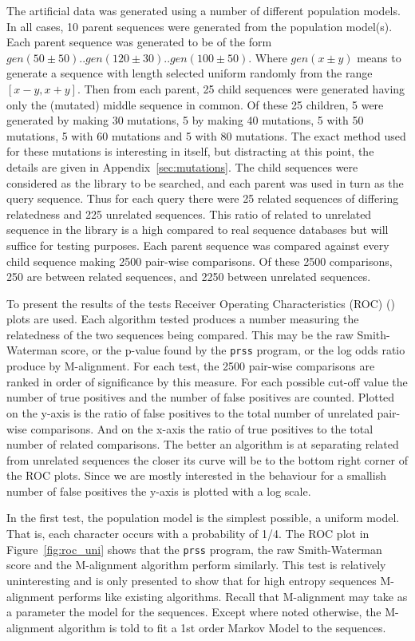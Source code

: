 \documentclass[letterpaper,11pt,oneside]{article}
\begin{document}
The artificial data was generated using a number of different population
models.  In all cases, 10 parent sequences were generated from the population
model(s).  Each parent sequence was generated to be of the form $gen(50\pm50)
.. gen(120\pm30) .. gen(100\pm50)$.  Where $gen(x\pm y)$ means to generate a
sequence with length selected uniform randomly from the range $[x-y, x+y]$.
Then from each parent, 25 child sequences were generated having only the
(mutated) middle sequence in common.  Of these 25 children, 5 were generated
by making 30 mutations, 5 by making 40 mutations, 5 with 50 mutations, 5 with
60 mutations and 5 with 80 mutations.  The exact method used for these
mutations is interesting in itself, but distracting at this point, the details
are given in Appendix~\ref{sec:mutations}.  The child sequences were
considered as the library to be searched, and each parent was used in turn as
the query sequence.  Thus for each query there were 25 related sequences of
differing relatedness and 225 unrelated sequences.  This ratio of related to
unrelated sequence in the library is a high compared to real sequence
databases but will suffice for testing purposes.  Each parent sequence was
compared against every child sequence making 2500 pair-wise comparisons.  Of
these 2500 comparisons, 250 are between related sequences, and 2250 between
unrelated sequences.

To present the results of the tests Receiver Operating Characteristics (ROC)
(\cite{gribskov96, brenner98}) plots are used.  Each algorithm tested produces
a number measuring the relatedness of the two sequences being compared.  This
may be the raw Smith-Waterman score, or the p-value found by the \verb!prss! 
program, or the log odds ratio produce by M-alignment.  For each test, the
2500 pair-wise comparisons are ranked in order of significance by this
measure.  For each possible cut-off value the number of true positives and the
number of false positives are counted.  Plotted on the y-axis is the ratio of
false positives to the total number of unrelated pair-wise comparisons.  And
on the x-axis the ratio of true positives to the total number of related
comparisons.  The better an algorithm is at separating related from unrelated
sequences the closer its curve will be to the bottom right corner of the ROC
plots.  Since we are mostly interested in the behaviour for a smallish number
of false positives the y-axis is plotted with a log scale.

In the first test, the population model is the simplest possible, a uniform
model.  That is, each character occurs with a probability of 1/4.  The ROC
plot in Figure~\ref{fig:roc_uni} shows that the \verb!prss! program, the raw
Smith-Waterman score and the M-alignment algorithm perform similarly.  This
test is relatively uninteresting and is only presented to show that for high
entropy sequences M-alignment performs like existing algorithms.  Recall that
M-alignment may take as a parameter the model for the sequences.  Except where
noted otherwise, the M-alignment algorithm is told to fit a 1st order Markov
Model to the sequences.
\end{document}
